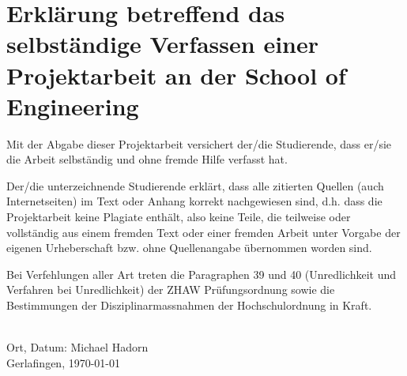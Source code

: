 
\chapter*{Erklärung betreffend das selbständige Verfassen einer Projektarbeit an der School of Engineering}

Mit der Abgabe dieser Projektarbeit versichert der/die Studierende, dass er/sie die Arbeit selbständig und ohne fremde Hilfe verfasst hat.

Der/die unterzeichnende Studierende erklärt, dass alle zitierten Quellen (auch Internetseiten) im Text oder Anhang korrekt nachgewiesen sind, d.h. dass die Projektarbeit keine Plagiate enthält, also keine Teile, die teilweise oder vollständig aus einem fremden Text oder einer fremden Arbeit unter Vorgabe der eigenen Urheberschaft bzw. ohne Quellenangabe übernommen worden sind.

Bei Verfehlungen aller Art treten die Paragraphen 39 und 40 (Unredlichkeit und Verfahren bei Unredlichkeit) der ZHAW Prüfungsordnung sowie die Bestimmungen der Disziplinarmassnahmen der Hochschulordnung in Kraft.

%
\mbox{}\vspace{4\baselineskip}\\
%
Ort, Datum: \hfill Michael Hadorn\\
Gerlafingen, \today



%

